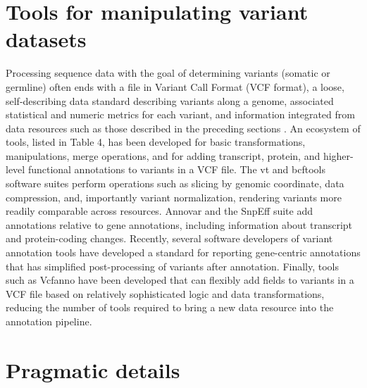 \documentclass[10pt,letterpaper]{article}
\begin{document}
\section{Tools for manipulating variant datasets}

 


Processing sequence data with the goal of determining variants
(somatic or germline) often ends with a file in Variant Call Format
(VCF format), a loose, self-describing data standard describing
variants along a genome, associated statistical and numeric metrics
for each variant, and information integrated from data resources such
as those described in the preceding sections \cite{Danecek2011-du}. An
ecosystem of tools, listed in Table 4, has been developed for basic
transformations, manipulations, merge operations, and for adding
transcript, protein, and higher-level functional annotations to
variants in a VCF file. The vt and bcftools software suites perform
operations such as slicing by genomic coordinate, data compression,
and, importantly variant normalization, rendering variants more
readily comparable across resources. Annovar
\cite{Yang2015-bg,Wang2010-bt} and the SnpEff suite
\cite{Cingolani2012-pt} add annotations relative to gene annotations,
including information about transcript and protein-coding
changes. Recently, several software developers of variant annotation
tools have developed a standard for reporting gene-centric annotations
that has simplified post-processing of variants after
annotation. Finally, tools such as Vcfanno \cite{Pedersen2016-pu} have
been developed that can flexibly add fields to variants in a VCF file
based on relatively sophisticated logic and data transformations,
reducing the number of tools required to bring a new data resource
into the annotation pipeline.

\section{Pragmatic details}
\end{document}
